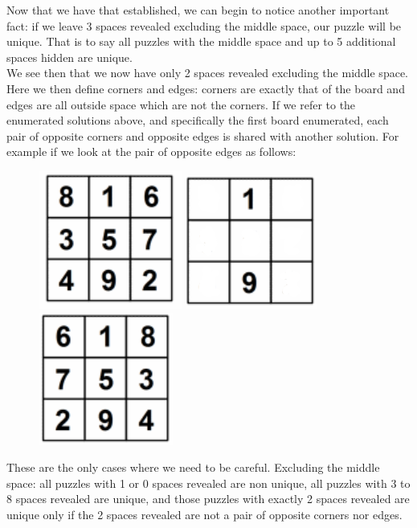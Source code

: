 \documentclass[a4paper]{article}
\begin{document}
Now that we have that established, we can begin to notice another important fact: if we leave 3 spaces revealed excluding the middle space, our puzzle will be unique. That is to say all puzzles with the middle space and up to 5 additional spaces hidden are unique. \\

We see then that we now have only 2 spaces revealed excluding the middle space. Here we then define corners and edges: corners are exactly that of the board and edges are all outside space which are not the corners. If we refer to the enumerated solutions above, and specifically the first board enumerated, each pair of opposite corners and opposite edges is shared with another solution. For example if we look at the pair of opposite edges as follows:

\begin{figure} [h]
\includegraphics{solution_1}
\includegraphics{example_2}
\includegraphics{example_3}
\centering
\end{figure}

These are the only cases where we need to be careful. Excluding the middle space: all puzzles with 1 or 0 spaces revealed are non unique, all puzzles with 3 to 8 spaces revealed are unique, and those puzzles with exactly 2 spaces revealed are unique only if the 2 spaces revealed are not a pair of opposite corners nor edges.
\end{document}
